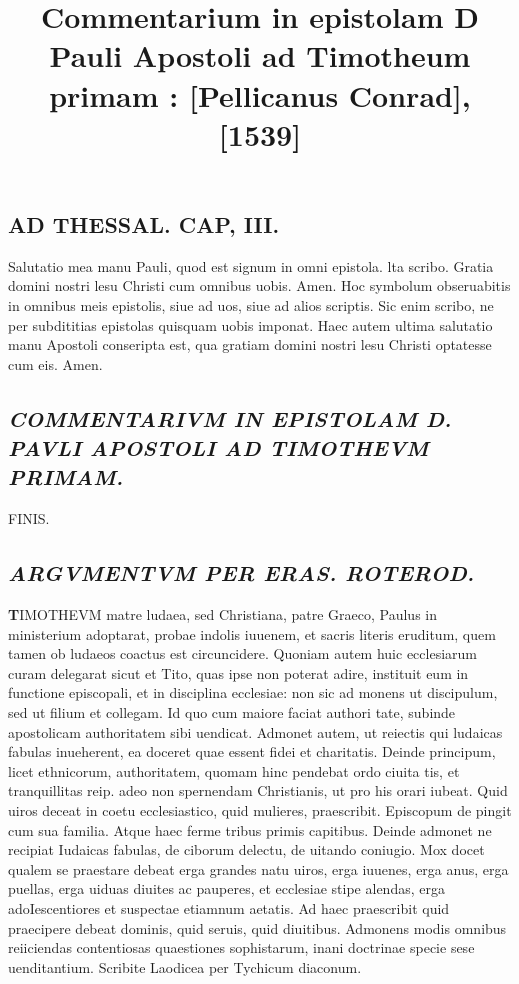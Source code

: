 \documentclass{article}
\begin{document}
\date{}
        \title{Commentarium in epistolam D Pauli Apostoli ad Timotheum primam : [Pellicanus Conrad], [1539]}
\maketitle
\tableofcontents
\clearpage
\begin{pages} 
\beginnumbering
        
\section*{AD THESSAL. CAP, III. }
\marginpar{[ p.463 ]}\pstart Salutatio mea manu Pauli, quod est signum in omni epistola. lta scribo. Gratia domini nostri lesu Christi cum omnibus uobis. Amen.  \pend\pstart Hoc symbolum obseruabitis in omnibus meis epistolis, siue ad uos, siue ad alios scriptis. Sic enim scribo, ne per subdititias epistolas quisquam uobis imponat. Haec autem ultima salutatio manu Apostoli conseripta est, qua gratiam domini nostri lesu Christi optatesse cum eis. Amen.  \pend
{}
{}
\subsection*{\textit{COMMENTARIVM IN EPISTOLAM D. PAVLI APOSTOLI AD TIMOTHEVM PRIMAM. }}\pstart FINIS.  \pend
{}
{}
\subsection*{\textit{ARGVMENTVM PER ERAS. ROTEROD. }}\pstart \huge\textbf{T}\normalsize IMOTHEVM matre ludaea, sed Christiana, patre Graeco, Paulus in ministerium adoptarat, probae indolis iuuenem, et sacris literis eruditum, quem tamen ob ludaeos coactus est circuncidere. Quoniam autem huic ecclesiarum curam delegarat sicut et Tito, quas ipse non poterat adire, instituit eum in functione episcopali, et in disciplina ecclesiae: non sic ad monens ut discipulum, sed ut filium et collegam. Id quo cum maiore faciat authori tate, subinde apostolicam authoritatem sibi uendicat. Admonet autem, ut reiectis qui ludaicas fabulas inueherent, ea doceret quae essent fidei et charitatis. Deinde principum, licet ethnicorum, authoritatem, quomam hinc pendebat ordo ciuita tis, et tranquillitas reip. adeo non spernendam Christianis, ut pro his orari iubeat. Quid uiros deceat in coetu ecclesiastico, quid mulieres, praescribit. Episcopum de pingit cum sua familia. Atque haec ferme tribus primis capitibus. Deinde admonet ne recipiat Iudaicas fabulas, de ciborum delectu, de uitando coniugio. Mox docet qualem se praestare debeat erga grandes natu uiros, erga iuuenes, erga anus, erga puellas, erga uiduas diuites ac pauperes, et ecclesiae stipe alendas, erga adoIescentiores et suspectae etiamnum aetatis. Ad haec praescribit quid praecipere debeat dominis, quid seruis, quid diuitibus. Admonens modis omnibus reiiciendas contentiosas quaestiones sophistarum, inani doctrinae specie sese uenditantium. Scribite Laodicea per Tychicum diaconum.  \pend
{}
{}

\end{pages}
\end{document}
